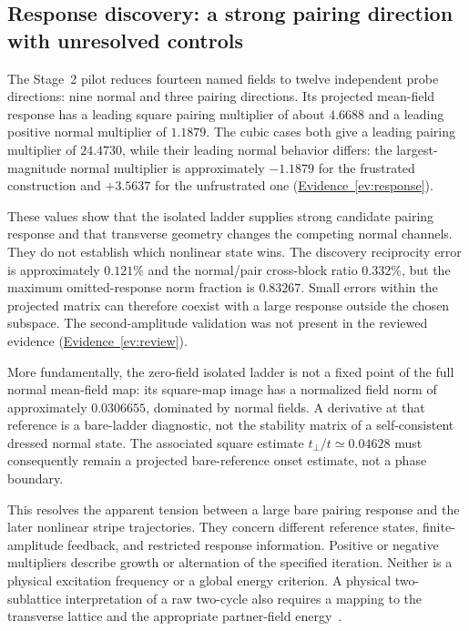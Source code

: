 \documentclass[11pt,letterpaper]{article}
\newcommand{\tp}{t_{\perp}}
\newcommand{\ev}[1]{\hyperref[ev:#1]{Evidence~\ref*{ev:#1}}}
\begin{document}
\subsection{Response discovery: a strong pairing direction with unresolved controls}
\label{sec:response}

The Stage~2 pilot reduces fourteen named fields to twelve independent probe
directions: nine normal and three pairing directions. Its projected
mean-field response has a leading square pairing multiplier of about
$4.6688$ and a leading positive normal multiplier of $1.1879$.
The cubic cases both give a leading pairing multiplier of $24.4730$,
while their leading normal behavior differs: the largest-magnitude normal
multiplier is approximately $-1.1879$ for the frustrated construction and
$+3.5637$ for the unfrustrated one (\ev{response}).

These values show that the isolated ladder supplies strong candidate pairing
response and that transverse geometry changes the competing normal channels.
They do not establish which nonlinear state wins. The discovery reciprocity
error is approximately $0.121\%$ and the normal/pair cross-block ratio
$0.332\%$, but the maximum omitted-response norm fraction is $0.83267$.
Small errors within the projected matrix can therefore coexist with a large
response outside the chosen subspace. The second-amplitude validation was not
present in the reviewed evidence (\ev{review}).

More fundamentally, the zero-field isolated ladder is not a fixed point of
the full normal mean-field map: its square-map image has a normalized field
norm of approximately $0.0306655$, dominated by normal fields. A derivative
at that reference is a bare-ladder diagnostic, not the stability matrix of a
self-consistent dressed normal state. The associated square estimate
$\tp/t\simeq0.04628$ must consequently remain a projected bare-reference
onset estimate, not a phase boundary.

This resolves the apparent tension between a large bare pairing response and
the later nonlinear stripe trajectories. They concern different reference
states, finite-amplitude feedback, and restricted response information.
Positive or negative multipliers describe growth or alternation of the
specified iteration. Neither is a physical excitation frequency or a global
energy criterion. A physical two-sublattice interpretation of a raw two-cycle
also requires a mapping to the transverse lattice and the appropriate
partner-field energy~\citep{Bollmark2025}.
\end{document}
